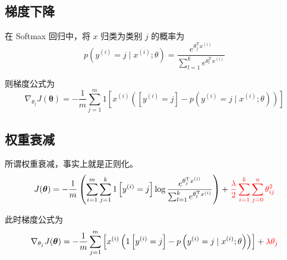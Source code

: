 \subsection{梯度下降}
在 Softmax 回归中，将 $x$ 归类为类别 $j$ 的概率为
\begin{equation}
    p\left(y^{(i)}=j \mid x^{(i)} ; \theta\right)
    =\frac{e^{\theta_{j}^{\mathrm T} x^{(i)}}}{\sum_{l=1}^{k} e^{\theta_{l}^{\mathrm T} x^{(i)}}}
\end{equation}

则梯度公式为
\begin{equation}
    \nabla_{\theta_{j}} J(\boldsymbol\theta)=-\frac{1}{m} 
    \sum_{j=1}^{m}1\left[x^{(i)}\left(\left[y^{(i)}=j\right]-p\left(y^{(i)}=j \mid x^{(i)} ; \theta\right)\right)\right]
\end{equation}

\subsection{权重衰减}
所谓权重衰减，事实上就是正则化。
\begin{equation}
    J(\boldsymbol{\theta}) = -\dfrac 1m \left(\sum_{i=1}^m\sum_{j=1}^k1\left[y^{(i)} = j\right]\log \dfrac{e^{\theta_j^\mathrm Tx^{(i)}}}{\sum_{l=1}^k 
    e^{\theta_l^\mathrm Tx^{(i)}}}\right) + \textcolor{red}{\dfrac \lambda 2\sum_{i=1}^k\sum_{j=0}^n\theta_{ij}^2}
\end{equation}

此时梯度公式为
\begin{equation}
    \nabla_{\theta_{j}} J(\boldsymbol\theta)=-\frac{1}{m} \sum_{j=1}^{m}
    \left[x^{(i)}\left(1\left[y^{(i)}=j\right]-p\left(y^{(i)}=j \mid x^{(i)} ; \theta\right)\right)\right] 
    + \textcolor{red}{\lambda \theta_j}
\end{equation}